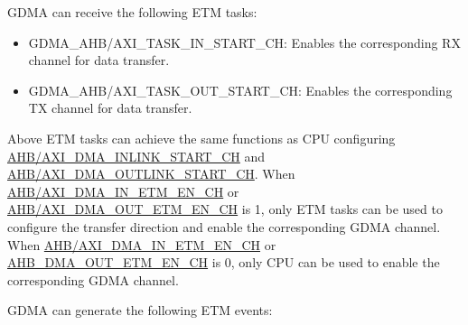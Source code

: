 \documentclass[main\_\_EN.tex]{subfiles}
\begin{document}
GDMA can receive the following ETM tasks:

\begin{itemize}
    \item GDMA\_AHB/AXI\_TASK\_IN\_START\_CH: Enables the corresponding RX channel  for data transfer.
    \item GDMA\_AHB/AXI\_TASK\_OUT\_START\_CH: Enables the corresponding TX channel  for data transfer.
\end{itemize}

\begin{tiplisting}
Above ETM tasks can achieve the same functions as CPU configuring \hyperref[fielddesc:AHBDMAINLINKSTARTCHN]{AHB/AXI\_DMA\_INLINK\_START\_CH} and \\\hyperref[fielddesc:AHBDMAOUTLINKSTARTCHN]{AHB/AXI\_DMA\_OUTLINK\_START\_CH}. When \hyperref[fielddesc:AHBDMAINETMENCHN]{AHB/AXI\_DMA\_IN\_ETM\_EN\_CH}  or \hyperref[fielddesc:AHBDMAOUTETMENCHN]{AHB/AXI\_DMA\_OUT\_ETM\_EN\_CH} is 1, only ETM tasks can be used to configure the transfer direction and enable the corresponding GDMA channel. When \hyperref[fielddesc:AHBDMAINETMENCHN]{AHB/AXI\_DMA\_IN\_ETM\_EN\_CH} or \hyperref[fielddesc:AHBDMAOUTETMENCHN]{AHB\_DMA\_OUT\_ETM\_EN\_CH} is 0, only CPU can be used to enable the corresponding GDMA channel.
\end{tiplisting}

GDMA can generate the following ETM events:
\end{document}
